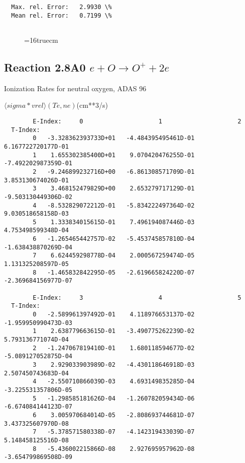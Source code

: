 \documentclass[12pt,dvipdfmx]{article}
\begin{document}
{\begin{small}
\begin{verbatim}
  Max. rel. Error:   2.9930 \%
  Mean rel. Error:   0.7199 \%


\end{verbatim}\end{small}
\begin{figure} \label{2.7A0}
\epsfxsize=16truecm 
\end{figure}
\newpage


\subsection{
Reaction 2.8A0 $e + O \rightarrow O^+  + 2e $ }
  Ionization Rates for neutral  oxygen,   ADAS 96

$  \langle sigma*vrel \rangle(Te,ne) $(cm**3/s)
\begin{small}\begin{verbatim}
        E-Index:     0                     1                     2
  T-Index:
        0   -3.328362393733D+01   -4.484395495461D-01    6.167722720177D-01
        1    1.655302385400D+01    9.070420476255D-01   -7.492202987359D-01
        2   -9.246899232716D+00   -6.861308571709D-01    3.853130674026D-01
        3    3.468152479829D+00    2.653279717129D-01   -9.503130449306D-02
        4   -8.532829072212D-01   -5.834222497364D-02    9.030518658158D-03
        5    1.333834015615D-01    7.496194087446D-03    4.753498599348D-04
        6   -1.265465442757D-02   -5.453745857810D-04   -1.638438870269D-04
        7    6.624459298778D-04    2.000567259474D-05    1.131325208597D-05
        8   -1.465832842295D-05   -2.619665824220D-07   -2.369684156977D-07

        E-Index:     3                     4                     5
  T-Index:
        0   -2.589961397492D-01    4.118976653137D-02   -1.959950990473D-03
        1    2.638779663615D-01   -3.490775262239D-02    5.793136771074D-04
        2   -1.247067819410D-01    1.680118594677D-02   -5.089127052875D-04
        3    2.929033903989D-02   -4.430118646918D-03    2.507450743683D-04
        4   -2.550710866039D-03    4.693149835285D-04   -3.225531357806D-05
        5   -1.298585181626D-04   -1.260782059434D-06   -6.674084144123D-07
        6    3.005970684014D-05   -2.808693744681D-07    3.437325607970D-08
        7   -5.378571580338D-07   -4.142319433039D-07    5.148458125516D-08
        8   -5.436002215866D-08    2.927695957962D-08   -3.654799869508D-09


\end{verbatim}
\end{small}}
\end{document}
